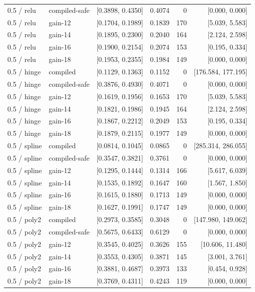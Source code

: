\begin{longtable}{@{}llrrrr@{}}
0.5 / relu & compiled-safe & [0.3898, 0.4350] & 0.4074 & 0 & [0.000, 0.000]\\
0.5 / relu & gain-12 & [0.1704, 0.1989] & 0.1839 & 170 & [5.039, 5.583]\\
0.5 / relu & gain-14 & [0.1895, 0.2300] & 0.2040 & 164 & [2.124, 2.598]\\
0.5 / relu & gain-16 & [0.1900, 0.2154] & 0.2074 & 153 & [0.195, 0.334]\\
0.5 / relu & gain-18 & [0.1953, 0.2355] & 0.1984 & 149 & [0.000, 0.000]\\
0.5 / hinge & compiled & [0.1129, 0.1363] & 0.1152 & 0 & [176.584, 177.195]\\
0.5 / hinge & compiled-safe & [0.3876, 0.4930] & 0.4071 & 0 & [0.000, 0.000]\\
0.5 / hinge & gain-12 & [0.1619, 0.1956] & 0.1653 & 170 & [5.039, 5.583]\\
0.5 / hinge & gain-14 & [0.1821, 0.1986] & 0.1945 & 164 & [2.124, 2.598]\\
0.5 / hinge & gain-16 & [0.1867, 0.2212] & 0.2049 & 153 & [0.195, 0.334]\\
0.5 / hinge & gain-18 & [0.1879, 0.2115] & 0.1977 & 149 & [0.000, 0.000]\\
0.5 / spline & compiled & [0.0814, 0.1045] & 0.0865 & 0 & [285.314, 286.055]\\
0.5 / spline & compiled-safe & [0.3547, 0.3821] & 0.3761 & 0 & [0.000, 0.000]\\
0.5 / spline & gain-12 & [0.1295, 0.1444] & 0.1314 & 166 & [5.617, 6.039]\\
0.5 / spline & gain-14 & [0.1535, 0.1892] & 0.1647 & 160 & [1.567, 1.850]\\
0.5 / spline & gain-16 & [0.1615, 0.1880] & 0.1713 & 149 & [0.000, 0.000]\\
0.5 / spline & gain-18 & [0.1627, 0.1991] & 0.1747 & 149 & [0.000, 0.000]\\
0.5 / poly2 & compiled & [0.2973, 0.3585] & 0.3048 & 0 & [147.980, 149.062]\\
0.5 / poly2 & compiled-safe & [0.5675, 0.6433] & 0.6129 & 0 & [0.000, 0.000]\\
0.5 / poly2 & gain-12 & [0.3545, 0.4025] & 0.3626 & 155 & [10.606, 11.480]\\
0.5 / poly2 & gain-14 & [0.3553, 0.4305] & 0.3871 & 145 & [3.001, 3.761]\\
0.5 / poly2 & gain-16 & [0.3881, 0.4687] & 0.3973 & 133 & [0.454, 0.928]\\
0.5 / poly2 & gain-18 & [0.3769, 0.4311] & 0.4243 & 119 & [0.000, 0.000]\\

\end{longtable}
